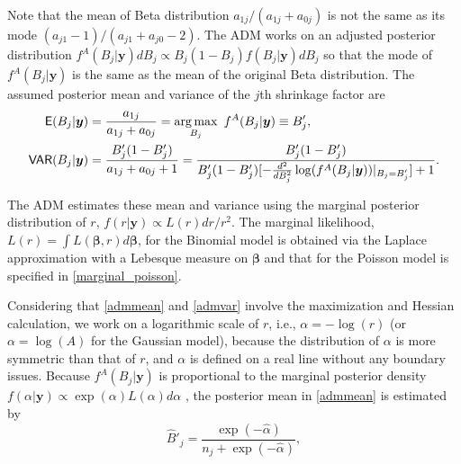\documentclass[article]{jss}
\DeclareMathOperator*{\argmax}{arg\,max}
\begin{document}
Note that the mean of Beta distribution $a_{1j}/(a_{1j}+a_{0j})$ is not the same as its mode $(a_{j1}-1)/(a_{j1}+a_{j0}-2)$. The ADM works on an adjusted posterior distribution $f^A(B_j\vert \boldsymbol{y})dB_j\propto B_j(1-B_j)f(B_j\vert \boldsymbol{y})dB_j$ so that the mode of $f^A(B_j\vert \boldsymbol{y})$ is the same as the mean of the original Beta distribution. The assumed posterior mean and variance of the $j$th shrinkage factor are
\begin{align}
\E(B_j\vert\boldsymbol{y})&=\frac{a_{1j}}{a_{1j}+a_{0j}}=\argmax_{B_j}~ f^A(B_j\vert \boldsymbol{y})\equiv B'_j,\label{admmean}\\
\VAR(B_j\vert\boldsymbol{y})&=\frac{B'_j(1-B'_j)}{a_{1j}+a_{0j}+1}=\frac{B'_j(1-B'_j)}{B'_j(1-B'_j)[-\frac{d^2}{dB^2_j}\log(f^A(B_j\vert \boldsymbol{y}))\vert_{B_j=B'_j}] +1}.\label{admvar}
\end{align}

The ADM estimates these mean and variance using the marginal posterior distribution of $r$, $f(r\vert\boldsymbol{y})\propto L(r)dr/r^2$. The marginal likelihood, $L(r)=\int L(\boldsymbol{\beta}, r)d\boldsymbol{\beta}$, for the Binomial model is obtained via the Laplace approximation with a Lebesque measure on $\boldsymbol{\beta}$ and that for the Poisson model is specified in  \eqref{marginal_poisson}. %

Considering that  \eqref{admmean} and  \eqref{admvar} involve the maximization and Hessian calculation, we work on a logarithmic scale of $r$, i.e., $\alpha=-\log(r)$ (or $\alpha=\log(A)$ for the Gaussian model), because the distribution of $\alpha$ is more symmetric than that of $r$, and $\alpha$ is defined on a real line without any boundary issues. Because $f^A(B_j\vert\boldsymbol{y})$ is proportional to the marginal posterior density $f(\alpha\vert\boldsymbol{y})\propto \exp(\alpha) L(\alpha)d\alpha$ \citep{tang2011}, the  posterior mean in  \eqref{admmean} is estimated by
\begin{equation}\label{meaninvariance}
\hat{B}'_j=\frac{\exp(-\hat{\alpha})}{n_j+\exp(-\hat{\alpha})},
\end{equation}

\end{document}
